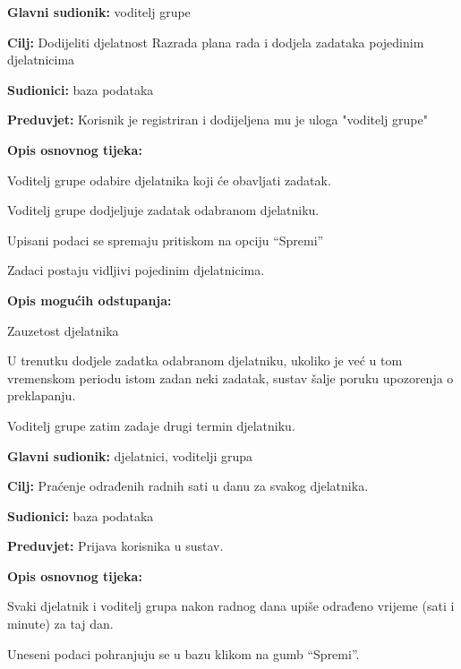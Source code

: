 			\begin{packed_item}
				\item \textbf{Glavni sudionik: } voditelj grupe
				\item  \textbf{Cilj:} Dodijeliti djelatnost Razrada plana rada i dodjela zadataka pojedinim djelatnicima
				\item  \textbf{Sudionici:} baza podataka
				\item  \textbf{Preduvjet:} Korisnik je registriran i dodijeljena mu je uloga "voditelj grupe"
				\item  \textbf{Opis osnovnog tijeka:}
				\item[] \begin{packed_enum}
					\item Voditelj grupe odabire djelatnika koji će obavljati zadatak.
					\item Voditelj grupe dodjeljuje zadatak odabranom djelatniku.
					\item Upisani podaci se spremaju pritiskom na opciju “Spremi” 
					\item Zadaci postaju vidljivi pojedinim djelatnicima. 
				\end{packed_enum}
				\item  \textbf{Opis mogućih odstupanja:}
				\item[] \begin{packed_item}
					\item[2.a] Zauzetost djelatnika
					\item[] \begin{packed_enum}
						\item U trenutku dodjele zadatka odabranom djelatniku, ukoliko je već u tom vremenskom periodu istom zadan neki zadatak, sustav šalje poruku upozorenja o preklapanju. 
						\item Voditelj grupe zatim zadaje drugi termin djelatniku. 
					\end{packed_enum}
				\end{packed_item}
			\end{packed_item}
			\noindent \underbar{\textbf{UC10 - Upis odrađenih sati}}
			\begin{packed_item}
				\item \textbf{Glavni sudionik: } djelatnici, voditelji grupa
				\item  \textbf{Cilj:} Praćenje odrađenih radnih sati u danu za svakog djelatnika.
				\item  \textbf{Sudionici:} baza podataka
				\item  \textbf{Preduvjet:} Prijava korisnika u sustav.
				\item  \textbf{Opis osnovnog tijeka:}
				\item[] \begin{packed_enum}
					\item Svaki djelatnik i voditelj grupa nakon radnog dana upiše odrađeno vrijeme (sati i minute) za taj dan.
					\item Uneseni podaci pohranjuju se u bazu klikom na gumb “Spremi”. 
				\end{packed_enum}
			\end{packed_item}
